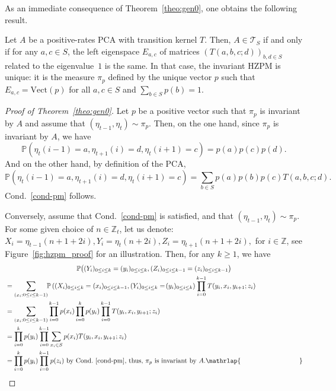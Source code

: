 \documentclass[AHL,Unicode,longabstracts]{cedram}
\newcounter{a}
\newcommand{\Cond}{Cond.}
\newcommand{\triangE}[1]{\mathcal{T}_{#1}}
\newcommand{\Z}{\mathbb{Z}}
\newcommand{\Pbb}{\mathbb{P}}
\begin{document}
As an immediate consequence of Theorem~\ref{theo:gen0}, one obtains the following result.

\begin{coro}\label{theo:gen}
Let $A$ be a positive-rates PCA with transition kernel $T$. Then, $A\in \triangE{S}$ if and only if for any $a,c \in S$, the left eigenspace $E_{a,c}$ of matrices $\left(T(a,b,c;d)\right)_{b,d \in S}$ related to the eigenvalue~$1$ is the same. In that case, the invariant HZPM is unique: it is the measure $\pi_p$ defined by the unique vector $p$ such that $E_{a,c} = \text{Vect}(p)$ for all $a,c\in S$ and $\sum_{b \in S} p(b) =1$.
\end{coro}

\begin{proof}[Proof of Theorem~\ref{theo:gen0}]
Let $p$ be a positive vector such that $\pi_p$ is invariant by $A$ and assume that $(\eta_{t-1},\eta_t) \sim \pi_p$. Then, on the one hand, since $\pi_p$ is invariant by $A$, we have
\begin{equation*}
\Pbb\left(\eta_{t}(i-1)=a, \eta_{t+1}(i) = d, \eta_{t}(i+1) = c\right) = p(a) p(c) p(d).
\end{equation*}
And on the other hand, by definition of the PCA,
\begin{equation*}
\Pbb\left(\eta_{t}(i-1)=a, \eta_{t+1}(i) = d, \eta_{t}(i+1) = c\right) = \sum_{b\in S} p(a) p(b) p(c) T(a,b,c;d).
\end{equation*}
\Cond~\ref{cond-pm} follows.

Conversely, assume that \Cond~\ref{cond-pm} is satisfied, and that $(\eta_{t-1},\eta_t) \sim \pi_p$. For some given choice of $n\in\Z_{t}$, let us denote: $X_i=\eta_{t-1}(n+1+2i), Y_i=\eta_{t}(n+2i), Z_i=\eta_{t+1}(n+1+2i),$ for $i\in \Z$, see Figure~\ref{fig:hzpm_proof} for an illustration. Then, for any $k\geq 1$, we have
\begin{multline*}
\Pbb\big((Y_i)_{0\leq i\leq k}= (y_i)_{0\leq i\leq k}, (Z_i)_{0\leq i\leq k-1}=(z_i)_{0\leq i\leq k-1}\big) \\
\begin{aligned}
&= \sum_{(x_i : 0\leq i\leq k-1)}\!\! \Pbb\left((X_i)_{0\leq i\leq k}=(x_i)_{0\leq i\leq k-1}, (Y_i)_{0\leq i\leq k}=\!(y_i)_{0\leq i\leq k}\right) \prod_{i=0}^{k-1} T(y_i,x_{i},y_{i+1};z_i)\\
&= \sum_{(x_i : 0\leq i\leq k-1)} \prod_{i=0}^{k-1} p(x_i) \prod_{i=0}^{k} p(y_i) \prod_{i=0}^{k-1} T(y_i,x_{i},y_{i+1};z_i) \\
&= \prod_{i=0}^{k} p(y_i) \prod_{i=0}^{k-1} \sum_{x_i\in S} p(x_i)T(y_i,x_{i},y_{i+1};z_i) \\
&= \prod_{i=0}^{k} p(y_i) \prod_{i=0}^{k-1} p(z_i) \text{ by \Cond~\ref{cond-pm}, thus, } \pi_p \text{ is invariant by } A.\mathrlap{\mkern 157mu\qed}
\end{aligned}
\end{multline*}
\let\qed\relax
\end{proof}
\end{document}
